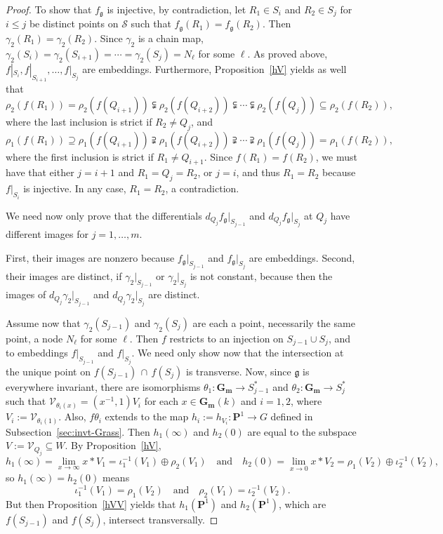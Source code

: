\documentclass[a4paper,11pt]{amsart}
\theoremstyle{plain}
\theoremstyle{definition}
\theoremstyle{remark}
\def\cc{{\mathbf G}_{\mathbf m}}
\def\V{\mathcal{V}}
\def\g{{\mathfrak g}}
\def\IP{{\mathbf P}}
\def\:{\colon}
\begin{document}
\begin{proof}
To show that $f_{\mathfrak g}$ is injective, by contradiction, let $R_1\in S_i$ and $R_2\in S_j$ for $i\leq j$ be distinct points on $\mathcal S$ such that $f_{\mathfrak g}(R_1)=f_{\mathfrak g}(R_2)$. Then $\gamma_2(R_1)=\gamma_2(R_2)$. Since $\gamma_2$ is a chain map, $\gamma_2(S_i)=\gamma_2(S_{i+1})=\cdots=\gamma_2(S_j)=N_\ell$ for some $\ell$. As proved above, $f|_{S_i},f|_{S_{i+1}},\dots,f|_{S_j}$ are embeddings. Furthermore, Proposition~\ref{hV} yields as well that 
\[
\rho_2(f(R_1))=\rho_2(f(Q_{i+1}))\subsetneqq\rho_2(f(Q_{i+2}))\subsetneqq\cdots\subsetneqq\rho_2(f(Q_{j}))\subseteq\rho_2(f(R_2)),
\]
where the last inclusion is strict if $R_2\neq Q_j$, and
\[
\rho_1(f(R_1))\supseteq\rho_1(f(Q_{i+1}))\supsetneqq\rho_1(f(Q_{i+2}))\supsetneqq\cdots\supsetneqq\rho_1(f(Q_{j}))=\rho_1(f(R_2)),
\]
where the first inclusion is strict if $R_1\neq Q_{i+1}$. Since $f(R_1)=f(R_2)$, we must have that either $j=i+1$ and $R_1=Q_j=R_2$, or $j=i$, and thus $R_1=R_2$ because $f|_{S_i}$ is injective. In any case, $R_1=R_2$, a contradiction.

We need now only prove that the differentials $d_{Q_j}f_{\mathfrak g}|_{S_{j-1}}$ and $d_{Q_j}f_{\mathfrak g}|_{S_j}$ at $Q_j$ have different images for $j=1,\dots,m$. 

First, their images are nonzero because $f_{\mathfrak g}|_{S_{j-1}}$ and $f_{\mathfrak g}|_{S_{j}}$ are embeddings. Second, their images are distinct, if $\gamma_2|_{S_{j-1}}$ or $\gamma_2|_{S_j}$ is not constant, because then the images of $d_{Q_j}\gamma_2|_{S_{j-1}}$ and $d_{Q_j}\gamma_2|_{S_j}$ are distinct. 

Assume now that $\gamma_2(S_{j-1})$ and $\gamma_2(S_j)$ are each a point, necessarily the same point, a node $N_\ell$ for some $\ell$. Then $f$ restricts to an injection on $S_{j-1}\cup S_j$, and to embeddings $f|_{S_{j-1}}$ and $f|_{S_j}$. We need only show now that the intersection at the unique point on $f(S_{j-1})\,\cap\,f(S_j)$ is transverse. Now, since $\g$ is everywhere invariant, there are isomorphisms $\theta_1\:\cc\to S_{j-1}^*$ and $\theta_2\:\cc\to S_j^*$ such that $\V_{\theta_i(x)}=(x^{-1},1)V_i$ for each $x\in\cc(k)$ and $i=1,2$, where $V_i:=\V_{\theta_i(1)}$. Also, $f\theta_i$ extends to the map $h_i:=h_{V_i}\colon\IP^1\to G$ defined in Subsection~\ref{sec:invt-Grass}. Then $h_1(\infty)$ and $h_2(0)$ are equal to the subspace $V:=\V_{Q_j}\subseteq W$. By Proposition~\ref{hV}, 
\[
h_1(\infty)=\lim_{x\to\infty}x\ast V_1=\iota_1^{-1}(V_1)\oplus\rho_2(V_1)\quad\text{and}\quad
h_2(0)=\lim_{x\to 0}x\ast V_2=\rho_1(V_2)\oplus\iota_2^{-1}(V_2),
\]
so $h_1(\infty)=h_2(0)$ means
\[
\iota_1^{-1}(V_1)=\rho_1(V_2)\quad\text{and}\quad \rho_2(V_1)=\iota_2^{-1}(V_2).
\]
But then Proposition~\ref{hVV} yields that $h_1(\IP^1)$ and $h_2(\IP^1)$, which are $f(S_{j-1})$ and $f(S_{j})$, intersect transversally. 


\end{proof}
\end{document}
